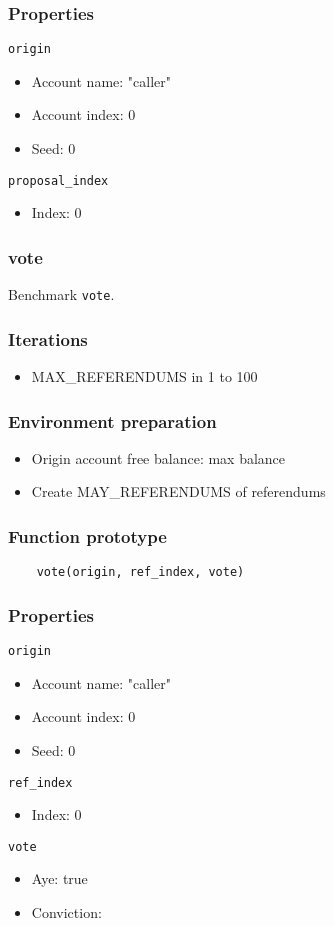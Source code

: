 \documentclass[11pt,a4paper]{article}
\begin{document}
\subsubsection*{Properties}
\verb|origin|
\begin{itemize}
    \item Account name: "caller"
    \item Account index: 0 
    \item Seed: 0
\end{itemize}
\verb|proposal_index|
\begin{itemize}
    \item Index: 0
\end{itemize}

\subsubsection{vote}

Benchmark \verb|vote|.

\subsubsection*{Iterations}
\begin{itemize}
    \item MAX\_REFERENDUMS in 1 to 100
\end{itemize}

\subsubsection*{Environment preparation}
\begin{itemize}
    \item Origin account free balance: max balance
    \item Create MAY\_REFERENDUMS of referendums
\end{itemize}

\subsubsection*{Function prototype}
\begin{verbatim}
    vote(origin, ref_index, vote)
\end{verbatim}

\subsubsection*{Properties}
\verb|origin|
\begin{itemize}
    \item Account name: "caller"
    \item Account index: 0 
    \item Seed: 0
\end{itemize}
\verb|ref_index|
\begin{itemize}
    \item Index: 0
\end{itemize}
\verb|vote|
\begin{itemize}
    \item Aye: true
    \item Conviction: 
\end{itemize}
\end{document}
